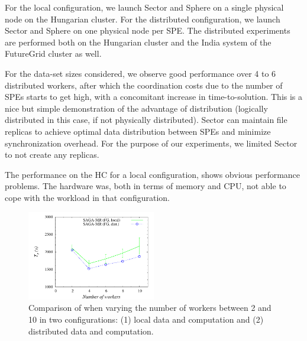 \documentclass[3p,twocolumn]{elsarticle}
\begin{document}

For the local configuration, we launch Sector and Sphere on a single physical
node on the Hungarian cluster. For the distributed configuration, we 
launch Sector and Sphere on one physical node per SPE. The distributed experiments
are performed both on the Hungarian cluster and the India system of the FutureGrid cluster as well. 

For the data-set sizes considered, we observe good performance over 4 to 6 
distributed workers, after which the coordination costs due to the number of SPEs starts to get high, with
a concomitant increase in time-to-solution. This is a nice but simple
demonstration of the advantage of distribution (logically distributed
in this case, if not physically distributed). Sector can maintain file
replicas to achieve optimal data distribution between SPEs and
minimize synchronization overhead. For the purpose of our experiments,
we limited Sector to not create any replicas.

The performance on the HC for a local configuration, shows obvious
performance problems.  The hardware was, both in terms of memory and
CPU, not able to cope with the workload in that configuration.

\begin{figure}[htb!]
 \dnnn\dnnn
 \includegraphics[width=0.5\textwidth]{figures/sagamr_varying_workers.pdf}
 \caption{ Comparison of \sagamapreduce when varying the number of
   workers between 2 and 10 in two configurations: (1) local data and
   computation and (2) distributed data and computation.
   \label{fig:sagamr_varying_workers}
   }
\end{figure}


 
\end{document}
